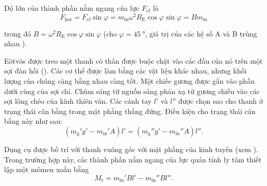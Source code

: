 Độ lớn của thành phần nằm ngang của lực $F_{\text{cf}}$ là
\begin{equation*}
	F_{\text{hor}} = F_{\text{cf}}\sin\varphi =  m_{\text{in}}\omega^2R_{\text{E}}\cos\varphi\sin\varphi = Bm_{\text{in}}
\end{equation*}

\noindent
trong đó $B=\omega^2R_{\text{E}}\cos\varphi\sin\varphi$ (cho $\varphi=\SI{45}{\degree}$, giá trị của các hệ số A và B trùng nhau ).

E\"{o}tv\"{o}s được treo một thanh có thân được buộc chặt vào các đầu của nó trên một sợi đàn hồi (). Các cơ thể được làm bằng các vật liệu khác nhau, nhưng khối lượng của chúng càng bằng nhau càng tốt. Một chiếc gương được gắn vào phần dưới cùng của sợi chỉ. Chùm sáng từ nguồn sáng phản xạ từ gương chiếu vào các sợi lông chéo của kính thiên văn. Các cánh tay $l'$ và $l''$ được chọn sao cho thanh ở trạng thái cân bằng trong mặt phẳng thẳng đứng. Điều kiện cho trạng thái cân bằng này như sau:
\begin{equation}\label{eq:6_21}
	(m_{\text{g}}'g' - m_{\text{in}}'A)l' = (m_{\text{g}}''g' - m_{\text{in}}''A)l''.
\end{equation}

\noindent
Dụng cụ được bố trí với thanh vuông góc với mặt phẳng của kinh tuyến (xem ). Trong trường hợp này, các thành phần nằm ngang của lực quán tính ly tâm thiết lập một mômen xoắn bằng
\begin{equation}\label{eq:6_22}
	M_{\text{t}} = m_{\text{in}}'Bl' - m_{\text{in}}''Bl''.
\end{equation}

